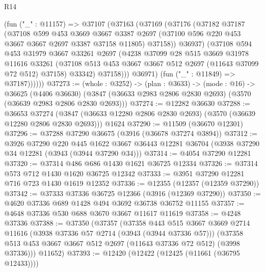\begin{lexlean}{R14}
\begin{coremodule}
              (fun ("_" : @11157) =>
              @37107
                (@37163
                  (@37169
                    (@37176
                      (@37182
                        @37187
                        (@37108
                          @599
                          @453
                          @3669
                          @3667
                          @3387
                          @2697
                          (@37100 @596 @220 @453 @3667 @3667 @2697 @3387 @37158 @11805)
                          @37158))
                      @36937)
                    (@37108
                      @594
                      @453
                      @31979
                      @3667
                      @33261
                      @2697
                      (@4238
                        @37099
                        @28
                        @515
                        @3669
                        @31978
                        @11616
                        @33261
                        (@37108 @513 @453 @3667 @3667 @512 @2697 (@11643 @37099 @72 @512) @37158)
                        @33342)
                      @37158)))
                @36971)
              (fun ("_" : @11849) => @37187))))))
@37273 := (whole : @3252) ->
  (plan : @3633) ->
  (mode : @16) ->
  @36625
    (@4406 @36630)
    (@3847 (@36633 @2983 @2806 @2830 @2693) (@3570 (@36639 @2983 @2806 @2830 @2693)))
@37274 := @12282 @36630
@37288 := @36653
    @37274
    (@3847 (@36633 @12280 @2806 @2830 @2693) (@3570 (@36639 @12280 @2806 @2830 @2693)))
    @1624
@37290 := @11509 (@36670 @12301)
@37296 := @37288 @37290 @36675 (@3916 (@36678 @37274 @3894))
@37312 := @3926
    @37290
    @220
    @445
    @1622
    @3667
    @36443
    @12281
    @36704
    (@3938 @37290 @34 @12281 (@3943 (@3944 @37290 @34)))
@37314 := @4054 @37290 @12281
@37320 := @37314 @486 @686 @1430 @1621 @36725 @12334
@37326 := @37314 @573 @712 @1430 @1620 @36725 @12342
@37333 := @3951 @37290 @12281 @716 @723 @1430 @1619 @12352
@37336 := @12355 (@12357 (@12359 @37290))
@37342 := @37333 @37336 @36725 @12366 (@3916 (@12369 @37290))
@37350 := @4620 @37336 @689 @1428 @494 @3692 @36738 @36752 @11155
@37357 := @4648 @37336 @530 @688 @3670 @3667 @11617 @11619
@37358 := @4248 @37336
@37388 := @37350
    (@37357
      (@37358
        @443
        @515
        @3667
        @3669
        @2714
        @11616
        (@3938 @37336 @57 @2714 (@3943 (@3944 @37336 @57)))
        (@37358 @513 @453 @3667 @3667 @512 @2697 (@11643 @37336 @72 @512) (@3998 @37336)))
      @11652)
@37393 := @12420 (@12422 (@12425 (@11661 (@36795 @12433))))

\end{coremodule}
\end{lexlean}
